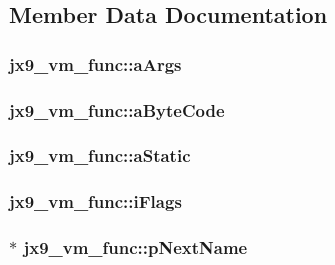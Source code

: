 \subsection{Member Data Documentation}
\hypertarget{structjx9__vm__func_aab6110c8f99e2c95eafecef2bd01f7d4}{
\subsubsection[{a\-Args}]{ jx9\-\_\-vm\-\_\-func\-::a\-Args}}\label{d6/d2b/structjx9__vm__func_aab6110c8f99e2c95eafecef2bd01f7d4}
\hypertarget{structjx9__vm__func_a64012215241b4484795aae8df3601b76}{
\subsubsection[{a\-Byte\-Code}]{ jx9\-\_\-vm\-\_\-func\-::a\-Byte\-Code}}\label{d6/d2b/structjx9__vm__func_a64012215241b4484795aae8df3601b76}
\hypertarget{structjx9__vm__func_af28cdd4cbc3ebc6daa004beff7b4c654}{
\subsubsection[{a\-Static}]{ jx9\-\_\-vm\-\_\-func\-::a\-Static}}\label{d6/d2b/structjx9__vm__func_af28cdd4cbc3ebc6daa004beff7b4c654}
\hypertarget{structjx9__vm__func_ac942cf2cf953fd066c529fdf015ed2b6}{
\subsubsection[{i\-Flags}]{ jx9\-\_\-vm\-\_\-func\-::i\-Flags}}\label{d6/d2b/structjx9__vm__func_ac942cf2cf953fd066c529fdf015ed2b6}
\hypertarget{structjx9__vm__func_a983c27ca0e5d273ef0791e5ef6cf6cb4}{
\subsubsection[{p\-Next\-Name}]{$\ast$ jx9\-\_\-vm\-\_\-func\-::p\-Next\-Name}}\label{d6/d2b/structjx9__vm__func_a983c27ca0e5d273ef0791e5ef6cf6cb4}
